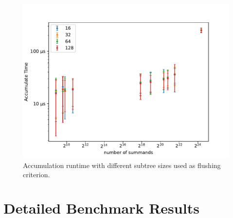 \begin{figure}[h!]
\centering
\includegraphics[scale=0.8]{figures/bufferSizes.pdf}
\caption{Accumulation runtime with different subtree sizes used as flushing criterion.}
\label{fig:bufferFlushingCriterion}
\end{figure}

\section{Detailed Benchmark Results}
\,
\newcommand{\mScale}{0.72}

